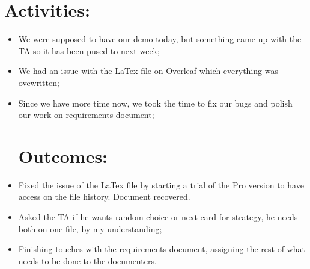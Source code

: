\documentclass[12pt]{article}
\begin{document}
\section{Activities:} 
\begin{itemize}
\item We were supposed to have our demo today, but something came up with the TA so it has been pused to next week;
\item We had an issue with the LaTex file on Overleaf which everything was ovewritten;
\item Since we have more time now, we took the time to fix our bugs and polish our work on requirements document;
\section{Outcomes:} 
\item Fixed the issue of the LaTex file by starting a trial of the Pro version to have access on the file history. Document recovered.
\item Asked the TA if he wants random choice or next card for strategy, he needs both on one file, by my understanding;
\item Finishing touches with the requirements document, assigning the rest of what needs to be done to the documenters.
\end {itemize}



\end{document}
